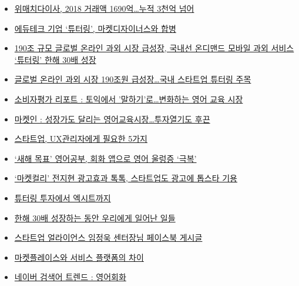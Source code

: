 \documentclass[11pt]{article}
\begin{document}
\begin{itemize}
\item
  \href{https://platum.kr/archives/114062}{위매치다이사, 2018 거래액
  1690억\ldots{}누적 3천억 넘어}
\item
  \href{https://platum.kr/archives/104597}{에듀테크 기업 `튜터링',
  마켓디자이너스와 합병}
\item
  \href{http://www.newstap.co.kr/news/articleView.html?idxno=68629}{190조
  규모 글로벌 온라인 과외 시장 급성장, 국내선 온디맨드 모바일 과외
  서비스 `튜터링' 한해 30배 성장}
\item
  \href{http://www.mashupangels.com/\%EA\%B8\%80\%EB\%A1\%9C\%EB\%B2\%8C-\%EC\%98\%A8\%EB\%9D\%BC\%EC\%9D\%B8-\%EA\%B3\%BC\%EC\%99\%B8-\%EC\%8B\%9C\%EC\%9E\%A5-190\%EC\%A1\%B0\%EC\%9B\%90-\%EA\%B8\%89\%EC\%84\%B1\%EC\%9E\%A5-\%EA\%B5\%AD\%EB\%82\%B4-\%EC\%8A\%A4\%ED\%83\%80\%ED\%8A\%B8/}{글로벌
  온라인 과외 시장 190조원 급성장\ldots{}국내 스타트업 튜터링 주목}
\item
  \href{http://www.iconsumer.or.kr/news/articleView.html?idxno=5017}{소비자평가
  리포트 : 토익에서 '말하기'로\ldots{}변화하는 영어 교육 시장}
\item
  \href{http://www.edaily.co.kr/news/read?newsId=01462886619142336\&mediaCodeNo=257}{마켓인
  : 성장가도 달리는 영어교육시장\ldots{}투자열기도 후끈}
\item
  \href{https://ppss.kr/archives/186393}{스타트업, UX관리자에게 필요한
  5가지}
\item
  \href{http://gametoc.hankyung.com/news/articleView.html?idxno=50684}{`새해
  목표' 영어공부, 회화 앱으로 영어 울렁증 `극복'}
\item
  \href{http://www.businesspost.co.kr/BP?command=article_view\&num=113609}{`마켓컬리'
  전지현 광고효과 톡톡, 스타트업도 광고에 톱스타 기용}
\item
  \href{https://liveandventure.com/2018/08/12/tutoring/}{튜터링 투자에서
  엑시트까지}
\item
  \href{https://brunch.co.kr/@insight-kmh/17}{한해 30배 성장하는 동안
  우리에게 일어난 일들}
\item
  \href{https://www.facebook.com/684762124/posts/10156503774537125/}{스타트업
  얼라이언스 임정욱 센터장님 페이스북 게시글}
\item
  \href{https://brunch.co.kr/@insight-kmh/26}{마켓플레이스와 서비스
  플랫폼의 차이}
\item
  \href{https://datalab.naver.com/keyword/trendResult.naver?hashKey=N_c74527ec567c919d711124833fb5d6c4}{네이버
  검색어 트렌드 : 영어회화}

\end{itemize}
\end{document}
